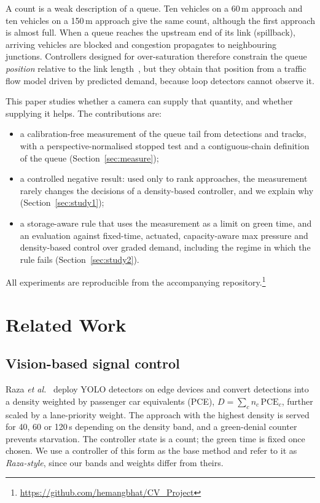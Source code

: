 \documentclass[journal]{IEEEtran}
\begin{document}
A count is a weak description of a queue. Ten vehicles on a 60\,m approach and ten
vehicles on a 150\,m approach give the same count, although the first approach is
almost full. When a queue reaches the upstream end of its link (spillback), arriving
vehicles are blocked and congestion propagates to neighbouring junctions. Controllers
designed for over-saturation therefore constrain the queue \emph{position} relative to
the link length~\cite{mohajerpoor2023}, but they obtain that position from a traffic
flow model driven by predicted demand, because loop detectors cannot observe it.

This paper studies whether a camera can supply that quantity, and whether supplying it
helps. The contributions are:
\begin{itemize}
\item a calibration-free measurement of the queue tail from detections and tracks,
with a perspective-normalised stopped test and a contiguous-chain definition of the
queue (Section~\ref{sec:measure});
\item a controlled negative result: used only to rank approaches, the measurement rarely changes the decisions of a density-based controller, and we explain why
(Section~\ref{sec:study1});
\item a storage-aware rule that uses the measurement as a limit on green time, and an
evaluation against fixed-time, actuated, capacity-aware max pressure and
density-based control over graded demand, including the regime in which the rule
fails (Section~\ref{sec:study2}).
\end{itemize}
All experiments are reproducible from the accompanying repository.\footnote{\url{https://github.com/hemangbhat/CV_Project}}

\section{Related Work}
\subsection{Vision-based signal control}
Raza \emph{et al.}~\cite{raza2025} deploy YOLO detectors on edge devices and convert
detections into a density weighted by passenger car equivalents (PCE),
$D=\sum_c n_c\,\mathrm{PCE}_c$, further scaled by a lane-priority weight. The approach
with the highest density is served for 40, 60 or 120\,s depending on the density band,
and a green-denial counter prevents starvation. The controller state is a count; the
green time is fixed once chosen. We use a controller of this form as the base method
and refer to it as \emph{Raza-style}, since our bands and weights differ from theirs.
\end{document}
